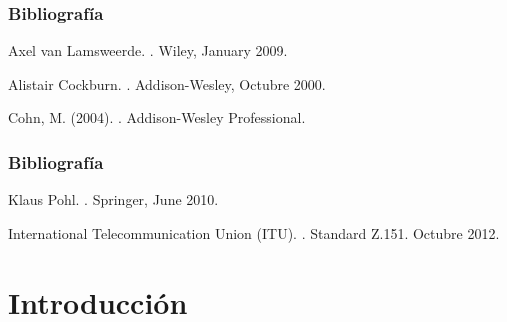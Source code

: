 \documentclass[handout,slidestop,xcolor=pst,dvips,blue]{beamer}
\begin{document}
\begin{frame}[c]
    \frametitle{Bibliografía}
    \begin{thebibliography}{1}
Axel van Lamsweerde.
.
\newblock Wiley, January 2009.

Alistair Cockburn.
.
\newblock Addison-Wesley, Octubre 2000.

Cohn, M. (2004).
.
\newblock Addison-Wesley Professional.

\end{thebibliography}
\end{frame}

\begin{frame}[c]
    \frametitle{Bibliografía}
    \begin{thebibliography}{1}

Klaus Pohl.
.
\newblock Springer, June 2010.

International Telecommunication Union (ITU).
.
\newblock Standard Z.151. Octubre 2012.

\end{thebibliography}
\end{frame}

\section{Introducción}
\end{document}
